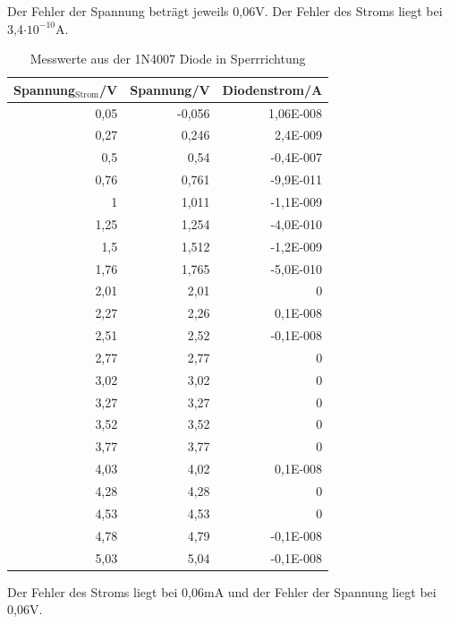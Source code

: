 \documentclass[12pt,a4paper]{article}
\begin{document}
\newpage

Der Fehler der Spannung beträgt jeweils 0,06V. Der Fehler des Stroms liegt bei 3,4$\cdot 10^{-10}$A.


\begin{table}[H]
\caption{Messwerte aus der 1N4007 Diode in Sperrrichtung}
\begin{center}
\begin{tabular}{|r|r|r|}
\hline
\multicolumn{1}{|l|}{Spannung$_\text{Strom}$/V } & \multicolumn{1}{l|}{Spannung/V} & \multicolumn{1}{l|}{Diodenstrom/A} \\ \hline
0,05 & -0,056 & 1,06E-008 \\ \hline
0,27 & 0,246 & 2,4E-009 \\ \hline
0,5 & 0,54 & -0,4E-007 \\ \hline
0,76 & 0,761 & -9,9E-011 \\ \hline
1 & 1,011 & -1,1E-009 \\ \hline
1,25 & 1,254 & -4,0E-010 \\ \hline
1,5 & 1,512 & -1,2E-009 \\ \hline
1,76 & 1,765 & -5,0E-010 \\ \hline
2,01 & 2,01 & 0 \\ \hline
2,27 & 2,26 & 0,1E-008 \\ \hline
2,51 & 2,52 & -0,1E-008 \\ \hline
2,77 & 2,77 & 0 \\ \hline
3,02 & 3,02 & 0 \\ \hline
3,27 & 3,27 & 0 \\ \hline
3,52 & 3,52 & 0 \\ \hline
3,77 & 3,77 & 0 \\ \hline
4,03 & 4,02 & 0,1E-008 \\ \hline
4,28 & 4,28 & 0 \\ \hline
4,53 & 4,53 & 0 \\ \hline
4,78 & 4,79 & -0,1E-008 \\ \hline
5,03 & 5,04 & -0,1E-008 \\ \hline
\end{tabular}
\end{center}
\label{tab:a1_2}
\end{table}

\newpage

Der Fehler des Stroms liegt bei 0,06mA und der Fehler der Spannung liegt bei 0,06V.
\end{document}

